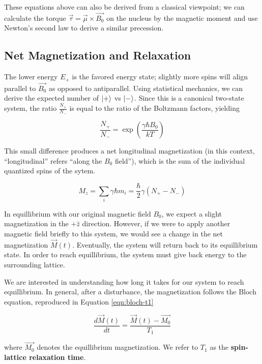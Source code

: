 \documentclass[%
 reprint,
 amsmath,amssymb,
 aps,
]{revtex4-2}
\DeclarePairedDelimiter\ket{\lvert}{\rangle}
\begin{document}
These equations above can also be derived from a classical viewpoint; we can calculate the torque $\vec{\tau}  =\vec{ \mu }\times \vec{B_0}$ on the nucleus by the magnetic moment and use Newton's second law to derive a similar precession.

\subsection{\label{subsec:pulses} Net Magnetization and Relaxation}

The lower energy $E_+$ is the favored energy state; slightly more spins will align parallel to $\vec{B_0}$ as opposed to antiparallel. Using statistical mechanics, we can derive the expected number of $\ket{+}$ vs $\ket{-}$. Since this is a canonical two-state system, the ratio $\frac{N_+}{N_-}$ is equal to the ratio of the Boltzmann factors, yielding 

\begin{equation}
    \frac{N_+}{N_-} = \exp\left(\frac{\gamma \hbar B_0}{k T}\right)
\end{equation}

This small difference produces a net longitudinal magnetization (in this context, ``longitudinal'' refers ``along the $B_0$ field''), which is the sum of the individual quantized spins of the sytem. 

\begin{equation}
    M_z = \sum_i \gamma \hbar m_i = \frac{\hbar}{2} \gamma (N_+ - N_-)
\end{equation}

In equillibrium with our original magnetic field $B_0$, we expect a slight magnetization in the $+\hat{z}$ direction. However, if we were to apply another magnetic field briefly to this system, we would see a change in the net magnetization $\vec{M}(t)$. Eventually, the system will return back to its equillibrium state. In order to reach equillibrium, the system must give back energy to the surrounding lattice. 

We are interested in understanding how long it takes for our system to reach equillibrium. In general, after a disturbance, the magnetization follows the Bloch equation, reproduced in Equation \ref{eqn:bloch-t1}

\begin{equation}\label{eqn:bloch-t1}
    \frac{d \vec{M}(t)}{dt} = \frac{\vec{M}(t)-\vec{M_0}}{T_1}
\end{equation}

where $\vec{M_0}$ denotes the equillibrium magnetization. We refer to $T_1$ as the \textbf{spin-lattice relaxation time}.
\end{document}
